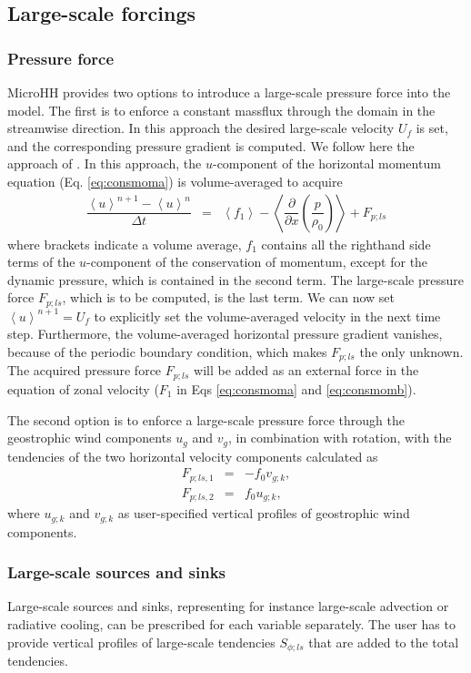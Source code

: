 \documentclass[gmd,manuscript]{copernicus}
\begin{document}
\subsection{Large-scale forcings}
\subsubsection{Pressure force}
MicroHH provides two options to introduce a large-scale pressure force into the model. The first is to enforce a constant massflux through the domain in the streamwise direction. In this approach the desired large-scale velocity $U_f$ is set, and the corresponding pressure gradient is computed. We follow here the approach of  \citet{vanReeuwijk2007}. In this approach, the $u$-component of the horizontal momentum equation (Eq. \ref{eq:consmoma}) is volume-averaged to acquire
\begin{eqnarray}
\dfrac{\left< u \right>^{n+1}  - \left< u \right>^{n}}{\Delta t} & = & \left< f_1 
\right> - \left< \dfrac{\partial}{\partial x} \left( \dfrac{p}{\rho_0} \right) \right>
+ F_{p;ls}
\end{eqnarray}
where brackets indicate a volume average, $f_1$ contains all the righthand side terms of the $u$-component of the conservation of momentum, except for the dynamic pressure, which is contained in the second term. The large-scale pressure force $F_{p;ls}$, which is to be computed, is the last term. We can now set $\left< u \right>^{n+1} = U_f$ to explicitly set the volume-averaged velocity in the next time step. Furthermore, the volume-averaged horizontal pressure gradient vanishes, because of the periodic boundary condition, which makes $F_{p;ls}$ the only unknown. The acquired pressure force $F_{p;ls}$ will be added as an external force in the equation of zonal velocity ($F_1$ in Eqs \ref{eq:consmoma} and \ref{eq:consmomb}).

The second option is to enforce a large-scale pressure force through the geostrophic wind components $u_g$ and $v_g$, in combination with rotation, with the tendencies of the two horizontal velocity components calculated as
\begin{eqnarray}
F_{p;ls,1} & = & -f_0 v_{g;k},\\
F_{p;ls,2} & = &  f_0 u_{g;k},
\end{eqnarray}
where $u_{g;k}$ and $v_{g;k}$ as user-specified vertical profiles of geostrophic wind components.

\subsubsection{Large-scale sources and sinks}
Large-scale sources and sinks, representing for instance large-scale advection or radiative cooling, can be prescribed for each variable separately. The user has to provide vertical profiles of large-scale tendencies $S_{\phi;ls}$ that are added to the total tendencies.
\end{document}
